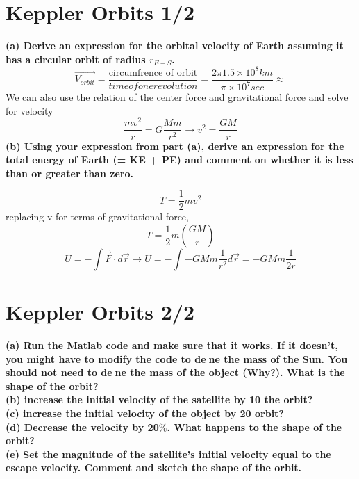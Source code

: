 \documentclass[paper=a4, fontsize=11pt]{scrartcl} %
\numberwithin{equation}{section} %
\numberwithin{figure}{section} %
\numberwithin{table}{section} %
\begin{document}
\section{Keppler Orbits 1/2}
\textbf{(a) Derive an expression for the orbital velocity of Earth assuming it has a circular orbit of
radius $r_{E-S}$.}\\
\begin{equation}
\vec{V_{orbit}} = \frac{\text{circumfrence of orbit}}{time of one revolution} = \frac{2\pi 1.5\times 10^{8}km}{\pi \times 10^7 sec} \approx
\end{equation}
We can also use the relation of the center force and gravitational force and solve for velocity
\begin{equation*}
\frac{mv^2}{r} = G\frac{Mm}{r^2 } \rightarrow v^2 = \frac{GM}{r}
\end{equation*}
\textbf{(b) Using your expression from part (a), derive an expression for the total energy of Earth
(= KE + PE) and comment on whether it is less than or greater than zero.}

\begin{equation*}
T = \frac{1}{2}mv^2
\end{equation*}
replacing v for terms of gravitational force,
\begin{equation*}
T= \frac{1}{2}m(\frac{GM}{r})
\end{equation*}
\begin{equation*}
U = -\int \vec{F}\cdot d\vec{r} \rightarrow U = - \int -GMm \frac{1}{r^2} d\vec{r} = -GMm\frac{1}{2r}
\end{equation*}
\section{Keppler Orbits 2/2}

\textbf{(a) Run the Matlab code and make sure that it works. If it doesn't, you might have to
modify the code to dene the mass of the Sun. You should not need to dene the mass of
the object (Why?). What is the shape of the orbit?}\\
\textbf{(b) increase the initial velocity of the satellite by 10%
the orbit?}\\
\textbf{(c) increase the initial velocity of the object by 20%
orbit?}\\
\textbf{(d) Decrease the  velocity by 20$\%$. What happens to the shape of the orbit?}\\
\textbf{(e) Set the magnitude of the satellite's initial velocity equal to the escape velocity. Comment and sketch the shape of the orbit.}
\end{document}
